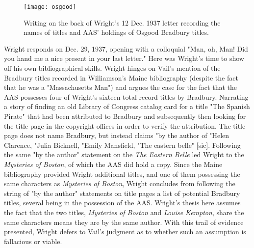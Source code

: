 \begin{figure}
\texttt{[image: osgood]}
\caption{Writing on the back of Wright's 12 Dec. 1937 letter recording the names of titles and AAS' holdings of Osgood Bradbury titles.}
\end{figure}

Wright responds on Dec. 29, 1937, opening with a colloquial "Man, oh, Man! Did you hand me a nice present in your last letter." Here was Wright's time to show off his own bibliographical skills. Wright hinges on Vail's mention of the Bradbury titles recorded in Williamson's Maine bibliography (despite the fact that he was a "Massachusetts Man") and argues the case for the fact that the AAS possesses four of Wright's sixteen total record titles by Bradbury. Narrating a story of finding an old Library of Congress catalog card for a title "The Spanish Pirate" that had been attributed to Bradbury and subsequently then looking for the title page in the copyright offices in order to verify the attribution. The title page does not name Bradbury, but instead claims "by the author of "Helen Clarence, "Julia Bicknell, "Emily Mansfield, "The eastern belle" [sic]. Following the same "by the author" statement on the \textit{The Eastern Belle} led Wright to the \textit{Mysteries of Boston}, of which the AAS did hold a copy. Since the Maine bibliography provided Wright additional titles, and one of them possessing the same characters as \textit{Mysteries of Boston}, Wright concludes from following the string of "by the author" statements on title pages a list of potential Bradbury titles, several being in the possession of the AAS.\autocite{lyle_h._wright_letter_1937-3} Wright's thesis here assumes the fact that the two titles, \textit{Mysteries of Boston} and \textit{Louise Kempton}, share the same characters means they are by the same author. With this trail of evidence presented, Wright defers to Vail's judgment as to whether such an assumption is fallacious or viable.


